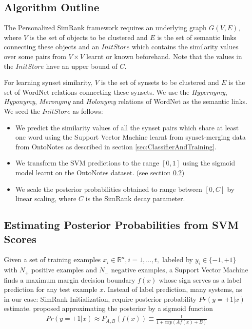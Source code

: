 
\subsection{Algorithm Outline}
\label{section:semiSupervisedAlgoOutline}
The Personalized SimRank framework requires an underlying graph $G(V,E)$, where $V$ is the set of objects to be clustered and $E$ is the set of semantic links connecting these objects and an $InitStore$ which contains the similarity values over some pairs from $V\times V$ learnt or known beforehand. Note that the values in the $InitStore$ have an upper bound of $C$.

For learning synset similarity, $V$ is the set of synsets to be clustered and $E$ is the set of WordNet relations connecting these synsets. We use the \textit{Hypernymy}, \textit{Hyponymy}, \textit{Meronymy} and \textit{Holonymy} relations of WordNet as the semantic links. We seed the $InitStore$ as follows:
\begin{itemize}
\item We predict the similarity values of all the synset pairs which share at least one word using the Support Vector Machine learnt from synset-merging data from OntoNotes \citep{Hovy:2006} as described in section \ref{sec:ClassifierAndTraining}.
\item We transform the SVM predictions to the range $[0,1]$ using the sigmoid model learnt on the OntoNotes dataset. (see section \ref{sec:EstimatingPosteriorProbabilitiesFromSVMScores})
\item We scale the posterior probabilities obtained to range between $[0,C]$ by linear scaling, where $C$ is the SimRank decay parameter.
\end{itemize}

\subsection{Estimating Posterior Probabilities from SVM Scores}
\label{sec:EstimatingPosteriorProbabilitiesFromSVMScores}
Given a set of training examples $x_i \in \mathbb{R}^n, i=1,\ldots,t,$ labeled by $y_i \in \{-1,+1\}$ with $N_+$ positive examples and $N_-$ negative examples, a Support Vector Machine finds a maximum margin decision boundary $f(x)$ whose sign serves as a label prediction for any test example $x$. Instead of label prediction, many systems, as in our case: SimRank Initialization, require posterior probability $Pr(y= +1|x)$ estimate. 
\citep{Platt99} proposed approximating the posterior by a sigmoid function
\begin{align}
Pr(y=+1|x) \approx P_{A,B}(f(x)) \equiv \frac{1}{1+exp{(Af(x)+B)}}
\end{align}

